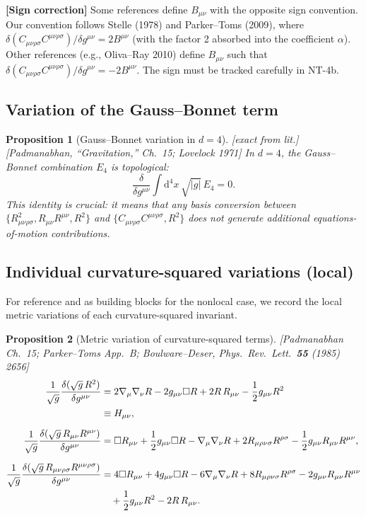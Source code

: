 \documentclass[12pt,a4paper]{article}
\newtheorem{proposition}{Proposition}[section]
\theoremstyle{definition}
\theoremstyle{remark}
\newcommand{\Rsq}{R_{\mu\nu\rho\sigma}R^{\mu\nu\rho\sigma}}
\newcommand{\Ricsq}{R_{\mu\nu}R^{\mu\nu}}
\newcommand{\Weylsq}{C_{\mu\nu\rho\sigma}C^{\mu\nu\rho\sigma}}
\newcommand{\dd}{\mathrm{d}}
\newcommand{\fromlit}[1]{\textcolor{blue!70!black}{\textsf{[#1]}}}
\newcommand{\exactlit}{\textcolor{blue!60!black}{\textsf{[exact from lit.]}}}
\newcommand{\signcorrection}[1]{%
  \par\noindent\colorbox{red!10}{%
    \parbox{\dimexpr\linewidth-2\fboxsep}{%
      \textcolor{red!50!black}{\textbf{[Sign correction]}}
      \textcolor{red!50!black}{#1}%
    }%
  }\par%
}
\begin{document}
\signcorrection{Some references define $B_{\mu\nu}$ with the opposite
sign convention.  Our convention follows Stelle (1978) and
Parker--Toms (2009), where $\delta(\Weylsq)/\delta g^{\mu\nu}
= 2B^{\mu\nu}$ (with the factor 2 absorbed into the coefficient
$\alpha$).  Other references (e.g., Oliva--Ray 2010) define
$B_{\mu\nu}$ such that $\delta(\Weylsq)/\delta g^{\mu\nu}
= -2B^{\mu\nu}$.  The sign must be tracked carefully in NT-4b.}


\subsection{Variation of the Gauss--Bonnet term}

\begin{proposition}[Gauss--Bonnet variation in $d=4$]
\label{prop:GB-var}
\exactlit\;
\fromlit{Padmanabhan, ``Gravitation,'' Ch.~15; Lovelock 1971}
In $d = 4$, the Gauss--Bonnet combination $E_4$ is topological:
\begin{equation}\label{eq:GB-var}
  \frac{\delta}{\delta g^{\mu\nu}}\int\dd^4 x\,\sqrt{|g|}\,E_4 = 0.
\end{equation}
This identity is crucial: it means that any basis conversion between
$\{R_{\mu\nu\rho\sigma}^2, \Ricsq, R^2\}$ and $\{\Weylsq, R^2\}$
does not generate additional equations-of-motion contributions.
\end{proposition}


\subsection{Individual curvature-squared variations (local)}

For reference and as building blocks for the nonlocal case, we record
the local metric variations of each curvature-squared invariant.

\begin{proposition}[Metric variation of curvature-squared terms]
\label{prop:curv-sq-var}
\fromlit{Padmanabhan Ch.~15; Parker--Toms App.~B;
Boulware--Deser, Phys.\ Rev.\ Lett.\ \textbf{55} (1985) 2656}
\begin{align}
  \frac{1}{\sqrt{g}}\frac{\delta(\sqrt{g}\,R^2)}{\delta g^{\mu\nu}}
  &= 2\nabla_\mu\nabla_\nu R - 2g_{\mu\nu}\Box R
    + 2R\,R_{\mu\nu} - \frac{1}{2}g_{\mu\nu}R^2
  \notag\\
  &\equiv H_{\mu\nu},
  \label{eq:var-R2}\\[6pt]
  \frac{1}{\sqrt{g}}\frac{\delta(\sqrt{g}\,\Ricsq)}{\delta g^{\mu\nu}}
  &= \Box R_{\mu\nu} + \frac{1}{2}g_{\mu\nu}\Box R
    - \nabla_\mu\nabla_\nu R
    + 2R_{\mu\rho\nu\sigma}R^{\rho\sigma}
    - \frac{1}{2}g_{\mu\nu}\Ricsq,
  \label{eq:var-Ric2}\\[6pt]
  \frac{1}{\sqrt{g}}\frac{\delta(\sqrt{g}\,\Rsq)}{\delta g^{\mu\nu}}
  &= 4\Box R_{\mu\nu} + 4g_{\mu\nu}\Box R
    - 6\nabla_\mu\nabla_\nu R
    + 8R_{\mu\rho\nu\sigma}R^{\rho\sigma}
    - 2g_{\mu\nu}\Ricsq
  \notag\\
  &\quad + \frac{1}{2}g_{\mu\nu}R^2
    - 2R\,R_{\mu\nu}.
  \label{eq:var-Riem2}
\end{align}
\end{proposition}
\end{document}
